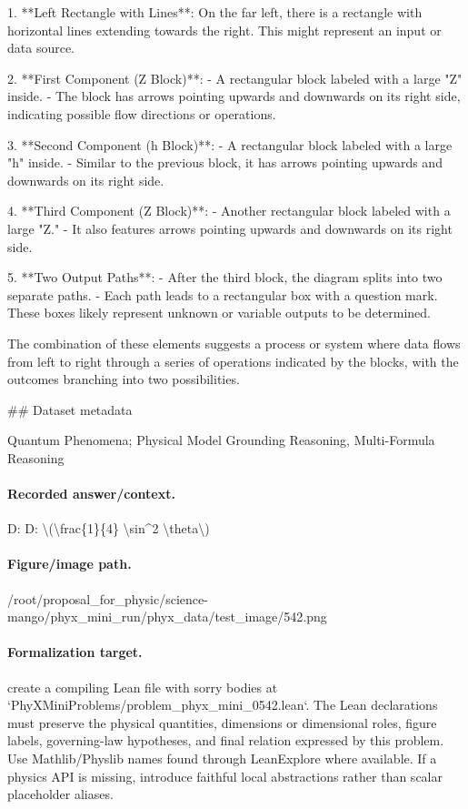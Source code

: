 1. **Left Rectangle with Lines**: On the far left, there is a rectangle with horizontal lines extending towards the right. This might represent an input or data source.

2. **First Component (Z Block)**: 
   - A rectangular block labeled with a large "Z" inside.
   - The block has arrows pointing upwards and downwards on its right side, indicating possible flow directions or operations.

3. **Second Component (h Block)**:
   - A rectangular block labeled with a large "h" inside.
   - Similar to the previous block, it has arrows pointing upwards and downwards on its right side.

4. **Third Component (Z Block)**:
   - Another rectangular block labeled with a large "Z."
   - It also features arrows pointing upwards and downwards on its right side.

5. **Two Output Paths**:
   - After the third block, the diagram splits into two separate paths.
   - Each path leads to a rectangular box with a question mark. These boxes likely represent unknown or variable outputs to be determined.

The combination of these elements suggests a process or system where data flows from left to right through a series of operations indicated by the blocks, with the outcomes branching into two possibilities.

\#\# Dataset metadata

Quantum Phenomena; Physical Model Grounding Reasoning, Multi-Formula Reasoning

\paragraph{Recorded answer/context.}
D: D: \textbackslash{}(\textbackslash{}frac\{1\}\{4\} \textbackslash{}sin\textasciicircum{}2 \textbackslash{}theta\textbackslash{})

\paragraph{Figure/image path.}
/root/proposal\_for\_physic/science-mango/phyx\_mini\_run/phyx\_data/test\_image/542.png

\paragraph{Formalization target.}
create a compiling Lean file with sorry bodies at `PhyXMiniProblems/problem\_phyx\_mini\_0542.lean`. The Lean declarations must preserve the physical quantities, dimensions or dimensional roles, figure labels, governing-law hypotheses, and final relation expressed by this problem.
Use Mathlib/Physlib names found through LeanExplore where available. If a physics API is missing, introduce faithful local abstractions rather than scalar placeholder aliases.

